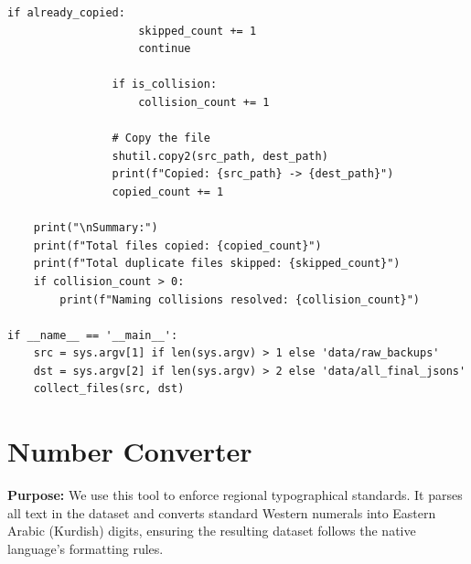 \documentclass[11pt]{article}
\begin{document}
\begin{lstlisting}[style=pythoncode, caption={json\_collector.py}]
                if already_copied:
                    skipped_count += 1
                    continue
                
                if is_collision:
                    collision_count += 1
                
                # Copy the file
                shutil.copy2(src_path, dest_path)
                print(f"Copied: {src_path} -> {dest_path}")
                copied_count += 1
                
    print("\nSummary:")
    print(f"Total files copied: {copied_count}")
    print(f"Total duplicate files skipped: {skipped_count}")
    if collision_count > 0:
        print(f"Naming collisions resolved: {collision_count}")

if __name__ == '__main__':
    src = sys.argv[1] if len(sys.argv) > 1 else 'data/raw_backups'
    dst = sys.argv[2] if len(sys.argv) > 2 else 'data/all_final_jsons'
    collect_files(src, dst)
\end{lstlisting}


\section{Number Converter} \label{sec:converter}
\textbf{Purpose:} We use this tool to enforce regional typographical standards. It parses all text in the dataset and converts standard Western numerals into Eastern Arabic (Kurdish) digits, ensuring the resulting dataset follows the native language's formatting rules.
\end{document}
